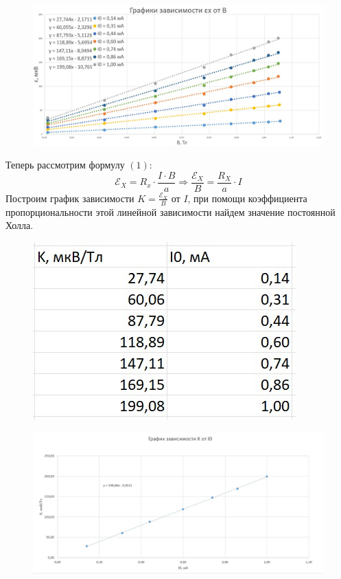 \documentclass[a4paper,12pt]{article}
\begin{document}
\begin{figure}[H]
	\begin{center}	\includegraphics[width=1\textwidth]{graph2.jpg}
	\end{center}
\end{figure}
Теперь рассмотрим формулу $(1)$:
\[\mathcal{E}_X = R_x \cdot \frac{I \cdot B}{a} \Rightarrow \frac{\mathcal{E}_X}{B} = \frac{R_X}{a} \cdot I\]
Построим график зависимости $K = \frac{\mathcal{E}_X}{B}$ от $I$, при помощи коэффициента пропорциональности этой линейной зависимости найдем значение постоянной Холла.
\begin{figure}[H]
	\begin{center}	\includegraphics[width=.4\textwidth]{tabliza3.jpg}
	\end{center}
\end{figure}

\begin{figure}[H]
	\begin{center}	\includegraphics[width=1\textwidth]{graph3.jpg}
	\end{center}
\end{figure}
\end{document}
